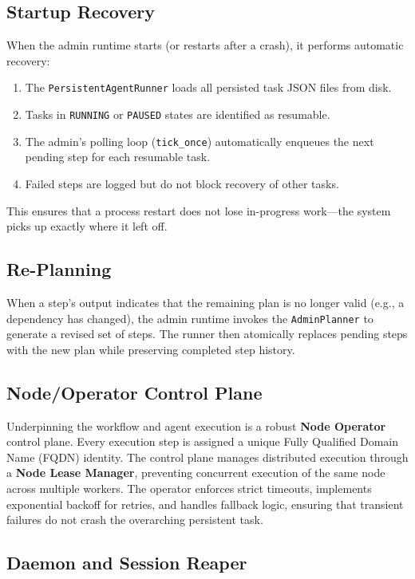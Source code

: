 \documentclass[11pt,a4paper]{article}
\begin{document}
\subsection{Startup Recovery}

When the admin runtime starts (or restarts after a crash), it performs automatic recovery:
\begin{enumerate}
  \item The \texttt{PersistentAgentRunner} loads all persisted task JSON files from disk.
  \item Tasks in \texttt{RUNNING} or \texttt{PAUSED} states are identified as resumable.
  \item The admin's polling loop (\texttt{tick\_once}) automatically enqueues the next pending step for each resumable task.
  \item Failed steps are logged but do not block recovery of other tasks.
\end{enumerate}

This ensures that a process restart does not lose in-progress work---the system picks up exactly where it left off.

\subsection{Re-Planning}

When a step's output indicates that the remaining plan is no longer valid (e.g., a dependency has changed), the admin runtime invokes the \texttt{AdminPlanner} to generate a revised set of steps.
The runner then atomically replaces pending steps with the new plan while preserving completed step history.

\subsection{Node/Operator Control Plane}

Underpinning the workflow and agent execution is a robust \textbf{Node Operator} control plane.
Every execution step is assigned a unique Fully Qualified Domain Name (FQDN) identity.
The control plane manages distributed execution through a \textbf{Node Lease Manager}, preventing concurrent execution of the same node across multiple workers.
The operator enforces strict timeouts, implements exponential backoff for retries, and handles fallback logic, ensuring that transient failures do not crash the overarching persistent task.

\subsection{Daemon and Session Reaper}
\end{document}
